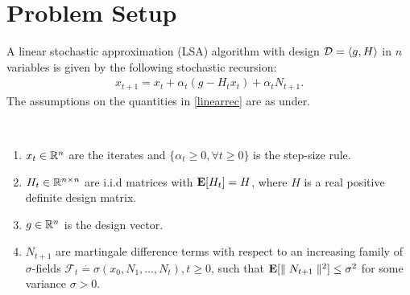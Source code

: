\section{Problem Setup}
A linear stochastic approximation (LSA) algorithm with design $\mathcal{D}=\langle g,H\rangle$ in $n$ variables is given by the following stochastic recursion:
\begin{align}\label{linearrec}
x_{t+1}=x_t+\alpha_t(g-H_t x_t)+\alpha_t N_{t+1}.
\end{align}
The assumptions on the quantities in \eqref{linearrec} are as under.
\begin{assumption}\label{lsaassump}
\hspace{10pt}\\
\vspace{-20pt}
\begin{enumerate}[leftmargin=*]
\item $x_t\in \mathbb{R}^n$ are the iterates and $\{\alpha_t\geq 0 ,\forall t\geq 0\}$ is the step-size rule.
\item\label{pd} $H_t\in \mathbb{R}^{n\times n}$ are i.i.d matrices with $\mathbf{E}[H_t]=H$, where $H$ is a real positive definite design matrix.
\item $g\in \mathbb{R}^n$ is the design vector.
\item $N_{t+1}$ are martingale difference terms  with respect to an increasing family of $\sigma$-fields $\mathcal{F}_t\stackrel{\cdot}{=}\sigma(x_0,N_1,\ldots,N_t),t\geq 0$, such that $\mathbf{E}[\parallel N_{t+1} \parallel^2]\leq \sigma^2$ for some variance $\sigma>0$.
\end{enumerate}
\end{assumption}
